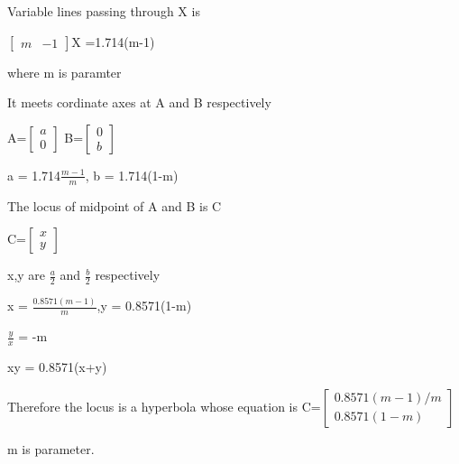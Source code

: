 \documentclass{beamer}
\begin{document}
\begin{frame}
Variable lines passing through X is




 $\begin{bmatrix}
 m &-1 
\end{bmatrix}$X =1.714(m-1)


where m is paramter


It meets cordinate axes at A and B respectively
 
A=$\begin{bmatrix}
  
a\\
0
    \end{bmatrix}$
B=$\begin{bmatrix}
  
0\\
b
    \end{bmatrix}$

a = 1.714$\frac{m-1}{m}$,
b = 1.714(1-m)
    
The locus of midpoint of A and B is C
    
    C=$\begin{bmatrix}
  
x\\
y
    \end{bmatrix}$


x,y are $\frac{a}{2}$ and $\frac{b}{2}$  respectively


x = $\frac{0.8571(m-1)}{m}$,y = 0.8571(1-m)


$\frac{y}{x}$ = -m

xy = 0.8571(x+y)

Therefore the locus is a hyperbola whose equation is
C=$\begin{bmatrix}
  
0.8571(m-1)/m\\
0.8571(1-m)
    \end{bmatrix}$


m is parameter.
\end{frame}
\end{document}
